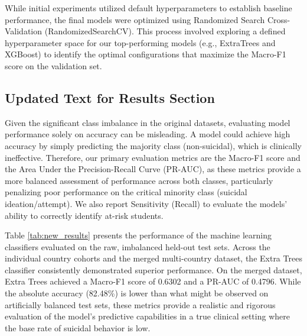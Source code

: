 \documentclass{article}
\begin{document}
While initial experiments utilized default hyperparameters to establish baseline performance, the final models were optimized using Randomized Search Cross-Validation (RandomizedSearchCV). This process involved exploring a defined hyperparameter space for our top-performing models (e.g., ExtraTrees and XGBoost) to identify the optimal configurations that maximize the Macro-F1 score on the validation set. 


\subsection*{Updated Text for Results Section}

Given the significant class imbalance in the original datasets, evaluating model performance solely on accuracy can be misleading. A model could achieve high accuracy by simply predicting the majority class (non-suicidal), which is clinically ineffective. Therefore, our primary evaluation metrics are the Macro-F1 score and the Area Under the Precision-Recall Curve (PR-AUC), as these metrics provide a more balanced assessment of performance across both classes, particularly penalizing poor performance on the critical minority class (suicidal ideation/attempt). We also report Sensitivity (Recall) to evaluate the models' ability to correctly identify at-risk students.

Table \ref{tab:new_results} presents the performance of the machine learning classifiers evaluated on the raw, imbalanced held-out test sets. Across the individual country cohorts and the merged multi-country dataset, the Extra Trees classifier consistently demonstrated superior performance. On the merged dataset, Extra Trees achieved a Macro-F1 score of 0.6302 and a PR-AUC of 0.4796. While the absolute accuracy (82.48\%) is lower than what might be observed on artificially balanced test sets, these metrics provide a realistic and rigorous evaluation of the model's predictive capabilities in a true clinical setting where the base rate of suicidal behavior is low.
\end{document}
